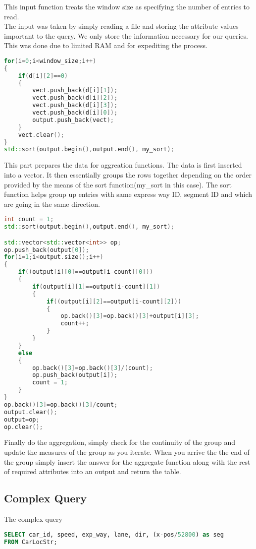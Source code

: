 This input function treats the window size as specifying the number of entries to read.\\
The input was taken by simply reading a file and storing the attribute values important to the query. We only store the information necessary for our queries. This was done due to limited RAM and for expediting the process.
\begin{lstlisting}[language=C++]
for(i=0;i<window_size;i++)
{
    if(d[i][2]==0)
    {
        vect.push_back(d[i][1]);
        vect.push_back(d[i][2]);
        vect.push_back(d[i][3]);
        vect.push_back(d[i][0]);
        output.push_back(vect);
    }
    vect.clear();
}
std::sort(output.begin(),output.end(), my_sort);
\end{lstlisting}
This part prepares the data for aggreation functions. The data is first inserted into a vector. It then essentially groups the rows together depending on the order provided by the means of the sort function(my\_sort in this case). The sort function helps group up entries with same express way ID, segment ID and which are going in the same direction.
\begin{lstlisting}[language=C++]
int count = 1;
std::sort(output.begin(),output.end(), my_sort);

std::vector<std::vector<int>> op;
op.push_back(output[0]);
for(i=1;i<output.size();i++)
{
    if((output[i][0]==output[i-count][0]))
    {
        if(output[i][1]==output[i-count][1])
        {
            if((output[i][2]==output[i-count][2]))
            {    
                op.back()[3]=op.back()[3]+output[i][3];
                count++;
            }
        }
    }
    else
    {
        op.back()[3]=op.back()[3]/(count);
        op.push_back(output[i]);
        count = 1;
    }
}
op.back()[3]=op.back()[3]/count;
output.clear();
output=op;
op.clear();
\end{lstlisting}
Finally do the aggregation, simply check for the continuity of the group and update the measures of the group as you iterate. When you arrive the the end of the group simply insert the answer for the aggregate function along with the rest of required attributes into an output and return the table.
\subsection{Complex Query}
The complex query\cite{linearroad_queries}
\begin{lstlisting}[language=SQL]
SELECT car_id, speed, exp_way, lane, dir, (x-pos/52800) as seg
FROM CarLocStr;
\end{lstlisting}

